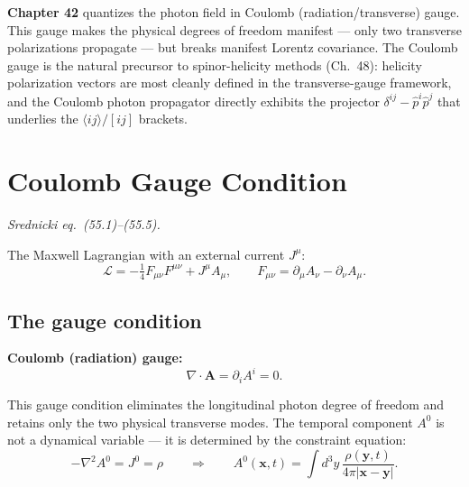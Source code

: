 \begin{mdframed}[backgroundcolor=blue!5]
\textbf{Chapter 42} quantizes the photon field in Coulomb (radiation/transverse) gauge.
This gauge makes the physical degrees of freedom manifest --- only two transverse
polarizations propagate --- but breaks manifest Lorentz covariance.  The Coulomb gauge
is the natural precursor to spinor-helicity methods (Ch.~48): helicity polarization
vectors are most cleanly defined in the transverse-gauge framework, and the
Coulomb photon propagator directly exhibits the projector
$\delta^{ij} - \hat p^i\hat p^j$ that underlies the $\langle ij\rangle/[ij]$ brackets.
\end{mdframed}

\section{Coulomb Gauge Condition}

\textit{Srednicki eq.\ (55.1)--(55.5).}

The Maxwell Lagrangian with an external current $J^\mu$:
\begin{equation}\label{eq:maxwell-lag}
  \mathcal{L} = -\tfrac{1}{4}F_{\mu\nu}F^{\mu\nu} + J^\mu A_\mu,
  \qquad F_{\mu\nu} = \partial_\mu A_\nu - \partial_\nu A_\mu.
\end{equation}

\subsection{The gauge condition}

\begin{mdframed}[backgroundcolor=blue!5]
\textbf{Coulomb (radiation) gauge:}
\begin{equation}\label{eq:coulomb-cond}
  \nabla\cdot\mathbf{A} = \partial_i A^i = 0.
\end{equation}
\end{mdframed}

This gauge condition eliminates the longitudinal photon degree of freedom and
retains only the two physical transverse modes.  The temporal component $A^0$ is
not a dynamical variable --- it is determined by the constraint equation:
\begin{equation}\label{eq:coulomb-A0}
  -\nabla^2 A^0 = J^0 = \rho \qquad \Rightarrow \qquad
  A^0(\mathbf{x},t) = \int d^3y\,\frac{\rho(\mathbf{y},t)}{4\pi|\mathbf{x}-\mathbf{y}|}.
\end{equation}

